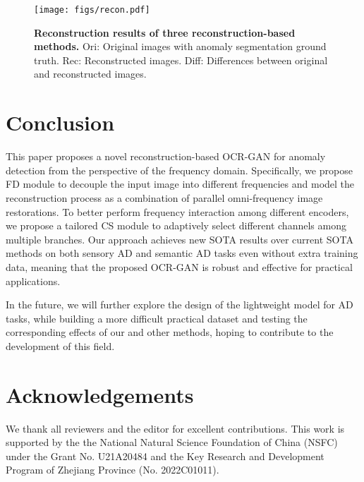 \documentclass[lettersize,journal]{IEEEtran}
\begin{document}
 \begin{figure}[tp]
	\centering
	\texttt{[image: figs/recon.pdf]}
	\caption{\textbf{Reconstruction results of three reconstruction-based methods.} Ori: Original images with anomaly segmentation ground truth. Rec: Reconstructed images. Diff: Differences between original and reconstructed images.}
	\vspace{-0.5em}
	\label{fig:recon}
\end{figure}

\section{Conclusion}\label{sec:conclusion}
This paper proposes a novel reconstruction-based OCR-GAN for anomaly detection from the perspective of the frequency domain. Specifically, we propose FD module to decouple the input image into different frequencies and model the reconstruction process as a combination of parallel omni-frequency image restorations. To better perform frequency interaction among different encoders, we propose a tailored CS module to adaptively select different channels among multiple branches. Our approach achieves new SOTA results over current SOTA methods on both sensory AD and semantic AD tasks even without extra training data, meaning that the proposed OCR-GAN is robust and effective for practical applications. 

In the future, we will further explore the design of the lightweight model for AD tasks, while building a more difficult practical dataset and testing the corresponding effects of our and other methods, hoping to contribute to the development of this field.

\section*{Acknowledgements}\label{sec:acknowledgements}
We thank all reviewers and the editor for excellent contributions. This work is supported by the the National Natural Science Foundation of China (NSFC) under the Grant No. U21A20484 and the Key Research and Development Program of Zhejiang Province (No. 2022C01011).



\end{document}
